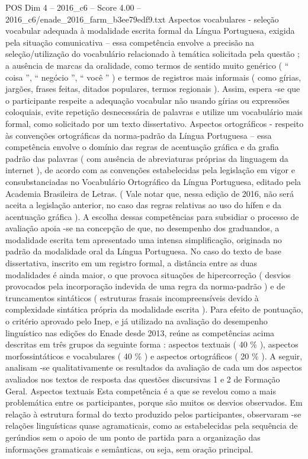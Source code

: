 \begin{textsample}{POS Dim 4 – 2016\_c6 – Score 4.00 – 2016\_c6/enade\_2016\_farm\_b3ee79edf9.txt}
Aspectos vocabulares - seleção vocabular adequada à modalidade escrita formal da Língua Portuguesa, exigida pela situação comunicativa – essa competência envolve a precisão na seleção/utilização do vocabulário relacionado à temática solicitada pela questão ; a ausência de marcas da oralidade, como termos de sentido muito genérico ( “ coisa ”, “ negócio ”, “ você ” ) e termos de registros mais informais ( como gírias, jargões, frases feitas, ditados populares, termos regionais ).
Assim, espera -se que o participante respeite a adequação vocabular não usando gírias ou expressões coloquiais, evite repetição desnecessária de palavras e utilize um vocabulário mais formal, como solicitado por um texto dissertativo.
Aspectos ortográficos - respeito às convenções ortográficas da norma-padrão da Língua Portuguesa – essa competência envolve o domínio das regras de acentuação gráfica e da grafia padrão das palavras ( com ausência de abreviaturas próprias da linguagem da internet ), de acordo com as convenções estabelecidas pela legislação em vigor e consubstanciadas no Vocabulário Ortográfico da Língua Portuguesa, editado pela Academia Brasileira de Letras. ( Vale notar que, nessa edição de 2016, não será aceita a legislação anterior, no caso das regras relativas ao uso do hífen e da acentuação gráfica ).
A escolha dessas competências para subsidiar o processo de avaliação apoia -se na concepção de que, no desempenho dos graduandos, a modalidade escrita tem apresentado uma intensa simplificação, originada no padrão da modalidade oral da Língua Portuguesa.
No caso do texto de base dissertativa, inscrito em um registro formal, a distância entre as duas modalidades é ainda maior, o que provoca situações de hipercorreção ( desvios provocados pela incorporação indevida de uma regra da norma-padrão ) e de truncamentos sintáticos ( estruturas frasais incompreensíveis devido à complexidade sintática própria da modalidade escrita ).
Para efeito de pontuação, o critério aprovado pelo Inep, e já utilizado na avaliação do desempenho linguístico nas edições do Enade desde 2013, reúne as competências acima descritas em três grupos da seguinte forma : aspectos textuais ( 40 \% ), aspectos morfossintáticos e vocabulares ( 40 \% ) e aspectos ortográficos ( 20 \% ).
A seguir, analisam -se qualitativamente os resultados da avaliação de cada um dos aspectos avaliados nos textos de resposta das questões discursivas 1 e 2 de Formação Geral.
Aspectos textuais Esta competência é a que se revelou como a mais problemática entre os participantes, porque são muitos os desvios observados.
Em relação à estrutura formal do texto produzido pelos participantes, observaram -se relações linguísticas quase agramaticais, como as estabelecidas pela sequência de gerúndios sem o apoio de um ponto de partida para a organização das informações gramaticais e semânticas, ou seja, sem oração principal.

\end{textsample}
